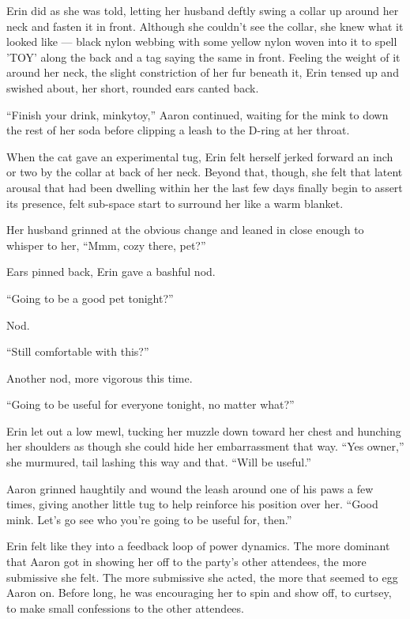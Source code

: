 \documentclass[12pt,letterpaper,oneside]{memoir}
\begin{document}
  Erin did as she was told, letting her husband deftly swing a collar up around her neck and fasten it in front. Although she couldn't see the collar, she knew what it looked like --- black nylon webbing with some yellow nylon woven into it to spell 'TOY' along the back and a tag saying the same in front. Feeling the weight of it around her neck, the slight constriction of her fur beneath it, Erin tensed up and swished about, her short, rounded ears canted back.

  ``Finish your drink, minkytoy,'' Aaron continued, waiting for the mink to down the rest of her soda before clipping a leash to the D-ring at her throat.

  When the cat gave an experimental tug, Erin felt herself jerked forward an inch or two by the collar at back of her neck. Beyond that, though, she felt that latent arousal that had been dwelling within her the last few days finally begin to assert its presence, felt sub-space start to surround her like a warm blanket.

  Her husband grinned at the obvious change and leaned in close enough to whisper to her, ``Mmm, cozy there, pet?''

  Ears pinned back, Erin gave a bashful nod.

  ``Going to be a good pet tonight?''

  Nod.

  ``Still comfortable with this?''

  Another nod, more vigorous this time.

  ``Going to be useful for everyone tonight, no matter what?''

  Erin let out a low mewl, tucking her muzzle down toward her chest and hunching her shoulders as though she could hide her embarrassment that way. ``Yes owner,'' she murmured, tail lashing this way and that. ``Will be useful.''

  Aaron grinned haughtily and wound the leash around one of his paws a few times, giving another little tug to help reinforce his position over her. ``Good mink. Let's go see who you're going to be useful for, then.''

  Erin felt like they into a feedback loop of power dynamics. The more dominant that Aaron got in showing her off to the party's other attendees, the more submissive she felt. The more submissive she acted, the more that seemed to egg Aaron on. Before long, he was encouraging her to spin and show off, to curtsey, to make small confessions to the other attendees.
\end{document}
